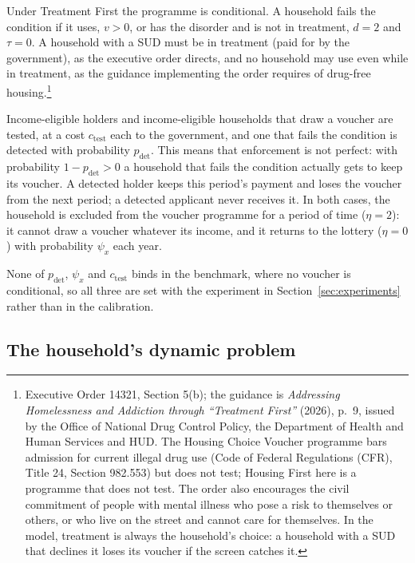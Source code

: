 \documentclass[10pt]{article}
\begin{document}
Under Treatment First the programme is conditional. A household fails the condition if
it uses, $v>0$, or has the disorder and is not in treatment, $d=2$ and $\tau=0$. A household with a SUD must be in treatment (paid for by the government), as the executive order directs, and no household may use even while in treatment, as the guidance implementing the order requires of drug-free housing.\footnote{ Executive Order 14321, Section 5(b); the guidance is \emph{Addressing Homelessness and Addiction through ``Treatment First''} (2026), p.~9, issued by the Office of National Drug Control Policy, the Department of Health and Human Services and HUD. The Housing Choice Voucher programme bars admission for current illegal drug use (Code of Federal Regulations (CFR), Title 24, Section 982.553) but does not test; Housing First here is a programme that does not test. The order also encourages the civil commitment of people with mental illness who pose a risk to themselves or others, or who live on the street and cannot care for themselves. In the model, treatment is always the household's choice: a household with a SUD that declines it loses its voucher if the screen catches it.}

Income-eligible holders and income-eligible households that draw a voucher are tested, at a cost
$c_{\text{test}}$ each to the government, and one that fails the condition is detected with probability
$p_{\text{det}}$. This means that enforcement is not perfect: with probability $1-p_{\text{det}}>0$ a household that fails the condition actually gets to keep its voucher. A detected holder keeps this period's payment
and loses the voucher from the next period; a detected applicant never receives it. In both cases,
the household is excluded from the voucher programme for a period of time ($\eta=2$): it cannot draw a voucher whatever its income, and it
returns to the lottery ($\eta=0$) with probability $\psi_x$ each year.

None of
$p_{\text{det}}$, $\psi_x$ and $c_{\text{test}}$ binds in the benchmark, where no voucher
is conditional, so all three are set with the experiment in
Section~\ref{sec:experiments} rather than in the calibration.

\subsection{The household's dynamic problem}\label{sec:fproblem}
\end{document}
